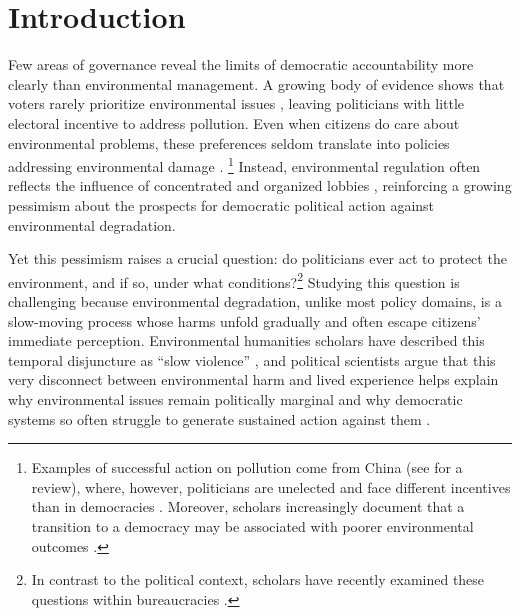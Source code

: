 \documentclass[12pt]{article}
\begin{document}
\clearpage
\section{Introduction}


Few areas of governance reveal the limits of democratic accountability more clearly than environmental management. A growing body of evidence shows that voters rarely prioritize environmental issues \citep{singh_thachil_2023_airpollution}, leaving politicians with little electoral incentive to address pollution. Even when citizens do care about environmental problems, these preferences seldom translate into policies addressing environmental damage \citep{dechezlepretre2025fighting, hsiao2025climate}.%
\footnote{Examples of successful action on pollution come from China (see \cite{bar_gulzar2025} for a review), where, however, politicians are unelected and face different incentives than in democracies \citep{buntaine2024does}. Moreover, scholars increasingly document that a transition to a democracy may be associated with poorer environmental outcomes \citep{sanford2023democratization, chesler2023democracy}.} Instead, environmental regulation often reflects the influence of concentrated and organized lobbies \citep{mcalexander2020elections, stokes2020short, harding2024buying, gonzalez2024money}, reinforcing a growing pessimism about the prospects for democratic political action against environmental degradation. 

Yet this pessimism raises a crucial question: do politicians ever act to protect the environment, and if so, under what conditions?\footnote{In contrast to the political context, scholars have recently examined these questions within bureaucracies \citep{dipoppa2024bureaucrat, buntaine2024does}.} Studying this question is challenging because environmental degradation, unlike most policy domains, is a slow-moving process whose harms unfold gradually and often escape citizens’ immediate perception. Environmental humanities scholars have described this temporal disjuncture as ``slow violence'' \citep{Nixon2013}, and political scientists argue that this very disconnect between environmental harm and lived experience helps explain why environmental issues remain politically marginal and why democratic systems so often struggle to generate sustained action against them \citep{grossman2026politics}.
\end{document}
